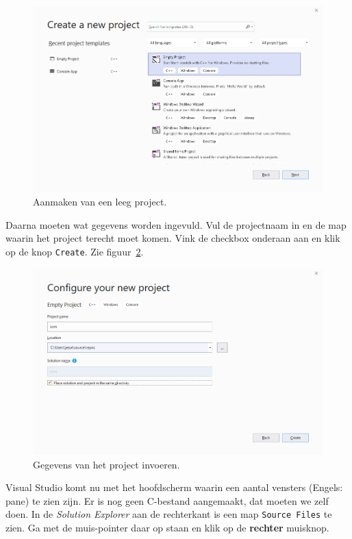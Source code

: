 \documentclass[a4paper,10pt,fleqn,twoside]{article}
\begin{document}
\begin{figure}[H]
\centering
\includegraphics[scale=0.5]{002create}
\caption{Aanmaken van een leeg project.}
\label{fig:002create}
\end{figure}

Daarna moeten wat gegevens worden ingevuld. Vul de projectnaam in en de map waarin het project terecht moet komen. Vink de checkbox onderaan aan en klik op de knop \texttt{Create}. Zie figuur~\ref{fig:003configure}.

\begin{figure}[H]
\centering
\includegraphics[scale=0.5]{003configure}
\caption{Gegevens van het project invoeren.}
\label{fig:003configure}
\end{figure}

Visual Studio komt nu met het hoofdscherm waarin een aantal vensters (Engels: pane) te zien zijn. Er is nog geen C-bestand aangemaakt, dat moeten we zelf doen. In de \textsl{Solution Explorer} aan de rechterkant is een map \texttt{Source Files} te zien. Ga met de muis-pointer daar op staan en klik op de \textbf{rechter} muisknop.
\end{document}
